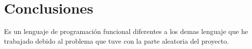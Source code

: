 \section{Conclusiones}
Es un lenguaje de programación funcional diferentes a los demas lenguaje que he trabajado debido al problema que tuve con la parte aleatoria del proyecto.
%

